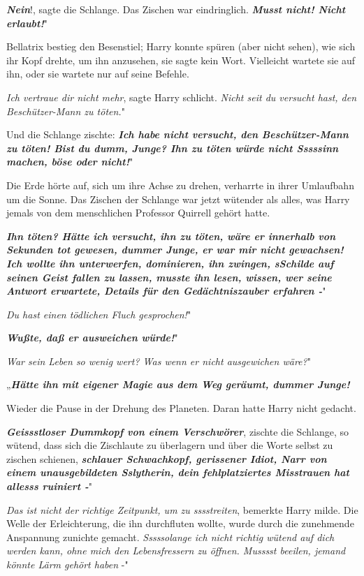 \glqq{}\textbf{\emph{Nein}}!\grqq{}, sagte die Schlange. Das Zischen war
eindringlich. \glqq{}\textbf{\emph{Musst nicht! Nicht erlaubt!}}"

Bellatrix bestieg den Besenstiel; Harry konnte spüren (aber nicht sehen), wie
sich ihr Kopf drehte, um ihn anzusehen, sie sagte kein Wort. Vielleicht wartete
sie auf ihn, oder sie wartete nur auf seine Befehle.

\glqq{}\emph{Ich vertraue dir nicht mehr}\grqq{}, sagte Harry schlicht. \glqq{}
\emph{Nicht seit du versucht hast, den Beschützer-Mann zu töten.}"

Und die Schlange zischte: \glqq{}\textbf{\emph{Ich habe nicht versucht, den
Beschützer-Mann zu töten! Bist du dumm, Junge? Ihn zu töten würde nicht Sssssinn
machen, böse oder nicht!}}"

Die Erde hörte auf, sich um ihre Achse zu drehen, verharrte in ihrer Umlaufbahn
um die Sonne. Das Zischen der Schlange war jetzt wütender als alles, was Harry
jemals von dem menschlichen Professor Quirrell gehört hatte.

\glqq{}\textbf{\emph{Ihn töten? Hätte ich versucht, ihn zu töten, wäre er
innerhalb von Sekunden tot gewesen, dummer Junge, er war mir nicht gewachsen!
Ich wollte ihn unterwerfen, dominieren, ihn zwingen, sSchilde auf seinen Geist
fallen zu lassen, musste ihn lesen, wissen, wer seine Antwort erwartete, Details
für den Gedächtniszauber erfahren -}}"

\glqq{}\emph{Du hast einen tödlichen Fluch gesprochen!}"

\glqq{}\textbf{\emph{Wußte, daß er ausweichen würde!}}"

\glqq{}\emph{War sein Leben so wenig wert? Was wenn er nicht ausgewichen wäre?}"

„\textbf{\emph{Hätte ihn mit eigener Magie aus dem Weg geräumt, dummer
Junge!}}\grqq{}

Wieder die Pause in der Drehung des Planeten. Daran hatte Harry nicht gedacht.

\glqq{}\textbf{\emph{Geissstloser Dummkopf von einem Verschwörer}}\grqq{},
zischte die Schlange, so wütend, dass sich die Zischlaute zu überlagern und über
die Worte selbst zu zischen schienen, \glqq{}\textbf{\emph{schlauer Schwachkopf,
gerissener Idiot, Narr von einem unausgebildeten Sslytherin, dein
fehlplatziertes Misstrauen hat allesss ruiniert -}}"

\glqq{}\emph{Das ist nicht der richtige Zeitpunkt, um zu sssstreiten}\grqq{},
bemerkte Harry milde. Die Welle der Erleichterung, die ihn durchfluten wollte,
wurde durch die zunehmende Anspannung zunichte gemacht. \glqq{}\emph{Sssssolange
ich nicht richtig wütend auf dich werden kann, ohne mich den Lebensfressern zu
öffnen. Musssst beeilen, jemand könnte Lärm gehört haben} -"

